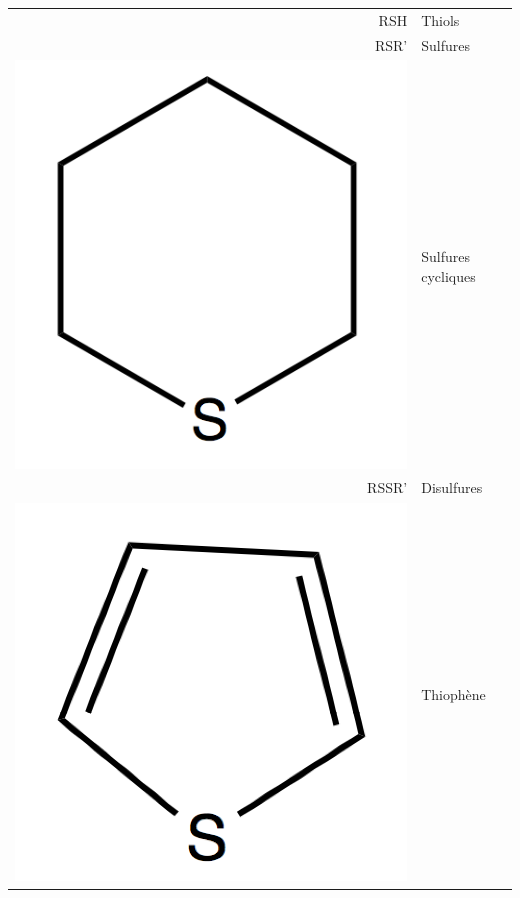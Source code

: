 \documentclass[12pt,a4paper]{book}
\begin{document}
\begin{table}[h!]
	\begin{center}
		\begin{tabular}{rl}
			\hline
			RSH & Thiols \\
			RSR' & Sulfures \\
			\includegraphics[scale=0.08]{../image/sulfure-cycle} & Sulfures cycliques \\
			RSSR' & Disulfures \\
			 \includegraphics[scale=0.08]{../image/thiophene} & Thiophène \\

\end{tabular}
\end{center}
\end{table}
\end{document}
